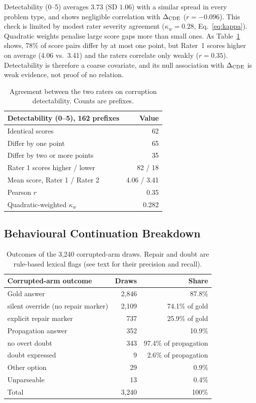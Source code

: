 Detectability (0--5) averages $3.73$ (SD $1.06$) with a similar spread in every problem type, and shows negligible correlation with $\Delta_{\mathrm{CDE}}$ ($r = -0.096$). This check is limited by modest rater severity agreement ($\kappa_w = 0.28$, Eq.~\ref{eq:kappa}). Quadratic weights penalise large score gaps more than small ones. As Table~\ref{tab:raters} shows, 78\% of score pairs differ by at most one point, but Rater~1 scores higher on average (4.06 vs.\ 3.41) and the raters correlate only weakly ($r = 0.35$). Detectability is therefore a coarse covariate, and its null association with $\Delta_{\mathrm{CDE}}$ is weak evidence, not proof of no relation.

\begin{table}[!htb]\centering\small\setlength{\tabcolsep}{4pt}
\caption{Agreement between the two raters on corruption detectability. Counts are prefixes.}
\label{tab:raters}
\begin{tabular}{@{}lr@{}}
\toprule Detectability (0--5), 162 prefixes & Value \\
\midrule
Identical scores & 62 \\
Differ by one point & 65 \\
Differ by two or more points & 35 \\
Rater 1 scores higher / lower & 82 / 18 \\
Mean score, Rater 1 / Rater 2 & 4.06 / 3.41 \\
Pearson $r$ & 0.35 \\
Quadratic-weighted $\kappa_w$ & 0.282 \\
\bottomrule\end{tabular}
\end{table}

\subsection{Behavioural Continuation Breakdown}

\begin{table}[!htb]\centering\small\setlength{\tabcolsep}{4pt}
\caption{Outcomes of the 3,240 corrupted-arm draws. Repair and doubt are rule-based lexical flags (see text for their precision and recall).}
\label{tab:behaviour}
\begin{tabular}{@{}lrr@{}}
\toprule Corrupted-arm outcome & Draws & Share \\
\midrule
Gold answer & 2,846 & 87.8\% \\
\quad silent override (no repair marker) & 2,109 & 74.1\% of gold \\
\quad explicit repair marker & 737 & 25.9\% of gold \\
Propagation answer & 352 & 10.9\% \\
\quad no overt doubt & 343 & 97.4\% of propagation \\
\quad doubt expressed & 9 & 2.6\% of propagation \\
Other option & 29 & 0.9\% \\
Unparseable & 13 & 0.4\% \\
\midrule
Total & 3,240 & 100\% \\
\bottomrule\end{tabular}
\end{table}

